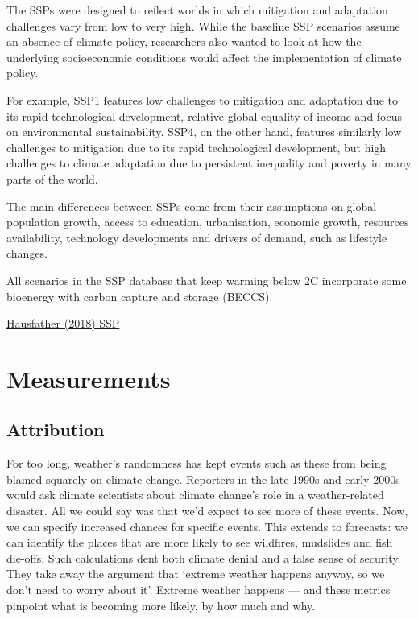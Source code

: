 \documentclass[
]{book}
\begin{document}
The SSPs were designed to reflect worlds in which mitigation and adaptation challenges vary from low to very high. While the baseline SSP scenarios assume an absence of climate policy, researchers also wanted to look at how the underlying socioeconomic conditions would affect the implementation of climate policy.

For example, SSP1 features low challenges to mitigation and adaptation due to its rapid technological development, relative global equality of income and focus on environmental sustainability. SSP4, on the other hand, features similarly low challenges to mitigation due to its rapid technological development, but high challenges to climate adaptation due to persistent inequality and poverty in many parts of the world.

The main differences between SSPs come from their assumptions on global population growth, access to education, urbanisation, economic growth, resources availability, technology developments and drivers of demand, such as lifestyle changes.

All scenarios in the SSP database that keep warming below 2C incorporate some bioenergy with carbon capture and storage (BECCS).

\href{https://www.carbonbrief.org/explainer-how-shared-socioeconomic-pathways-explore-future-climate-change}{Hausfather (2018) SSP}

\hypertarget{part-measurements}{%
\part{Measurements}\label{part-measurements}}

\hypertarget{attribution}{%
\chapter{Attribution}\label{attribution}}

For too long, weather's randomness has kept events such as these from being blamed squarely on climate change. Reporters in the late 1990s and early 2000s would ask climate scientists about climate change's role in a weather-related disaster. All we could say was that we'd expect to see more of these events. Now, we can specify increased chances for specific events. This extends to forecasts: we can identify the places that are more likely to see wildfires, mudslides and fish die-offs. Such calculations dent both climate denial and a false sense of security. They take away the argument that `extreme weather happens anyway, so we don't need to worry about it'. Extreme weather happens --- and these metrics pinpoint what is becoming more likely, by how much and why.
\end{document}
